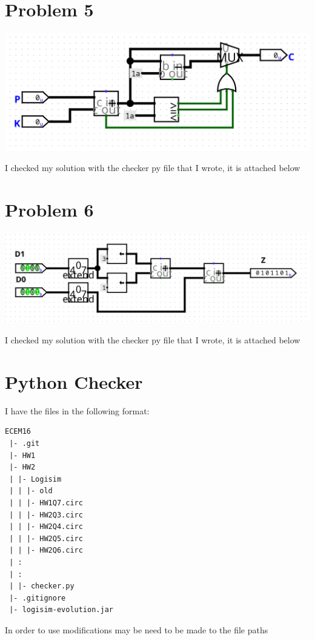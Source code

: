 \documentclass[12pt]{article}
\begin{document}
\section*{Problem 5}
\begin{center}
   \includegraphics[scale=0.25]{Problem5.png}
\end{center}
I checked my solution with the checker py file that I wrote, it  is attached below
\section*{Problem 6}
\begin{center}
   \includegraphics[scale=0.25]{Problem6.png}
\end{center}
I checked my solution with the checker py file that I wrote, it  is attached below
\pagebreak
\section*{Python Checker}

I have the files in the following format:
\begin{verbatim}
ECEM16
 |- .git
 |- HW1
 |- HW2
 | |- Logisim
 | | |- old
 | | |- HW1Q7.circ
 | | |- HW2Q3.circ
 | | |- HW2Q4.circ
 | | |- HW2Q5.circ
 | | |- HW2Q6.circ
 | :
 | :
 | |- checker.py
 |- .gitignore
 |- logisim-evolution.jar
\end{verbatim}
In order to use modifications may be  need to be made to the file paths
\end{document}
